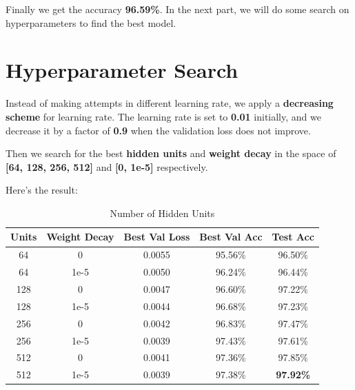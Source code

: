 \documentclass[a4paper, 11pt]{article} %
\begin{document}
Finally we get the accuracy \textbf{96.59\%}. In the next part, we will do some search on
hyperparameters to find the best model.

\bigskip


\section{\textbf{Hyperparameter Search}}

Instead of making attempts in different learning rate, we apply a \textbf{decreasing scheme}
for learning rate. The learning rate is set to \textbf{0.01} initially, and we decrease it
by a factor of \textbf{0.9} when the validation loss does not improve.

Then we search for the best \textbf{hidden units} and \textbf{weight decay} in the space of
\textbf{[64, 128, 256, 512]} and \textbf{[0, 1e-5]} respectively.

Here's the result:

\begin{table}[H]
	\begin{center}
		\begin{tabular}{ccccc}
			\toprule
			Units & Weight Decay & Best Val Loss & Best Val Acc & Test Acc         \\
			\midrule
			64    & 0            & 0.0055        & 95.56\%      & 96.50\%          \\
			64    & 1e-5         & 0.0050        & 96.24\%      & 96.44\%          \\
			128   & 0            & 0.0047        & 96.60\%      & 97.22\%          \\
			128   & 1e-5         & 0.0044        & 96.68\%      & 97.23\%          \\
			256   & 0            & 0.0042        & 96.83\%      & 97.47\%          \\
			256   & 1e-5         & 0.0039        & 97.43\%      & 97.61\%          \\
			512   & 0            & 0.0041        & 97.36\%      & 97.85\%          \\
			512   & 1e-5         & 0.0039        & 97.38\%      & \textbf{97.92\%} \\
			\bottomrule
		\end{tabular}
		\caption{Number of Hidden Units}
	\end{center}
\end{table}
\end{document}

